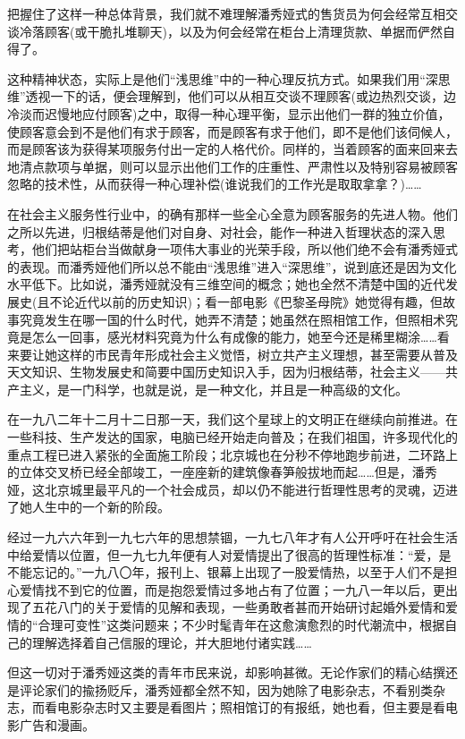 \par 把握住了这样一种总体背景，我们就不难理解潘秀娅式的售货员为何会经常互相交谈冷落顾客(或干脆扎堆聊天)，以及为何会经常在柜台上清理货款、单据而俨然自得了。
\par 这种精神状态，实际上是他们“浅思维”中的一种心理反抗方式。如果我们用“深思维”透视一下的话，便会理解到，他们可以从相互交谈不理顾客(或边热烈交谈，边冷淡而迟慢地应付顾客)之中，取得一种心理平衡，显示出他们一群的独立价值，使顾客意会到不是他们有求于顾客，而是顾客有求于他们，即不是他们该伺候人，而是顾客该为获得某项服务付出一定的人格代价。同样的，当着顾客的面来回来去地清点款项与单据，则可以显示出他们工作的庄重性、严肃性以及特别容易被顾客忽略的技术性，从而获得一种心理补偿(谁说我们的工作光是取取拿拿？)……
\par 在社会主义服务性行业中，的确有那样一些全心全意为顾客服务的先进人物。他们之所以先进，归根结蒂是他们对自身、对社会，能作一种进入哲理状态的深入思考，他们把站柜台当做献身一项伟大事业的光荣手段，所以他们绝不会有潘秀娅式的表现。而潘秀娅他们所以总不能由“浅思维”进入“深思维”，说到底还是因为文化水平低下。比如说，潘秀娅就没有三维空间的概念；她也全然不清楚中国的近代发展史(且不论近代以前的历史知识)；看一部电影《巴黎圣母院》她觉得有趣，但故事究竟发生在哪一国的什么时代，她弄不清楚；她虽然在照相馆工作，但照相术究竟是怎么一回事，感光材料究竟为什么有成像的能力，她至今还是稀里糊涂……看来要让她这样的市民青年形成社会主义觉悟，树立共产主义理想，甚至需要从普及天文知识、生物发展史和简要中国历史知识入手，因为归根结蒂，社会主义——共产主义，是一门科学，也就是说，是一种文化，并且是一种高级的文化。
\par 在一九八二年十二月十二日那一天，我们这个星球上的文明正在继续向前推进。在一些科技、生产发达的国家，电脑已经开始走向普及；在我们祖国，许多现代化的重点工程已进入紧张的全面施工阶段；北京城也在分秒不停地跑步前进，二环路上的立体交叉桥已经全部竣工，一座座新的建筑像春笋般拔地而起……但是，潘秀娅，这北京城里最平凡的一个社会成员，却以仍不能进行哲理性思考的灵魂，迈进了她人生中的一个新的阶段。
\par 经过一九六六年到一九七六年的思想禁锢，一九七八年才有人公开呼吁在社会生活中给爱情以位置，但一九七九年便有人对爱情提出了很高的哲理性标准：“爱，是不能忘记的。”一九八〇年，报刊上、银幕上出现了一股爱情热，以至于人们不是担心爱情找不到它的位置，而是抱怨爱情过多地占有了位置；一九八一年以后，更出现了五花八门的关于爱情的见解和表现，一些勇敢者甚而开始研讨起婚外爱情和爱情的“合理可变性”这类问题来；不少时髦青年在这愈演愈烈的时代潮流中，根据自己的理解选择着自己信服的理论，并大胆地付诸实践……
\par 但这一切对于潘秀娅这类的青年市民来说，却影响甚微。无论作家们的精心结撰还是评论家们的揄扬贬斥，潘秀娅都全然不知，因为她除了电影杂志，不看别类杂志，而看电影杂志时又主要是看图片；照相馆订的有报纸，她也看，但主要是看电影广告和漫画。
